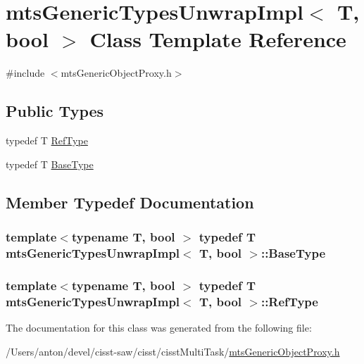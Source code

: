 \hypertarget{classmts_generic_types_unwrap_impl}{}\section{mts\+Generic\+Types\+Unwrap\+Impl$<$ T, bool $>$ Class Template Reference}
\label{classmts_generic_types_unwrap_impl}


{\ttfamily \#include $<$mts\+Generic\+Object\+Proxy.\+h$>$}

\subsection*{Public Types}
\begin{DoxyCompactItemize}
\item 
typedef T \hyperlink{classmts_generic_types_unwrap_impl_aad54104577cad75bd20cfb9efd80346b}{Ref\+Type}
\item 
typedef T \hyperlink{classmts_generic_types_unwrap_impl_a1ea28a8dbb0198e7d104daa728056213}{Base\+Type}
\end{DoxyCompactItemize}


\subsection{Member Typedef Documentation}
\hypertarget{classmts_generic_types_unwrap_impl_a1ea28a8dbb0198e7d104daa728056213}{}
\subsubsection[{Base\+Type}]{\setlength{\rightskip}{0pt plus 5cm}template$<$typename T, bool $>$ typedef T {\bf mts\+Generic\+Types\+Unwrap\+Impl}$<$ T, bool $>$\+::{\bf Base\+Type}}\label{classmts_generic_types_unwrap_impl_a1ea28a8dbb0198e7d104daa728056213}
\hypertarget{classmts_generic_types_unwrap_impl_aad54104577cad75bd20cfb9efd80346b}{}
\subsubsection[{Ref\+Type}]{\setlength{\rightskip}{0pt plus 5cm}template$<$typename T, bool $>$ typedef T {\bf mts\+Generic\+Types\+Unwrap\+Impl}$<$ T, bool $>$\+::{\bf Ref\+Type}}\label{classmts_generic_types_unwrap_impl_aad54104577cad75bd20cfb9efd80346b}


The documentation for this class was generated from the following file\+:\begin{DoxyCompactItemize}
\item 
/\+Users/anton/devel/cisst-\/saw/cisst/cisst\+Multi\+Task/\hyperlink{mts_generic_object_proxy_8h}{mts\+Generic\+Object\+Proxy.\+h}\end{DoxyCompactItemize}

